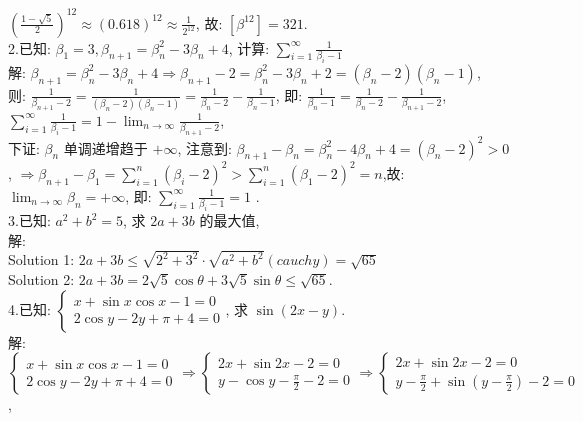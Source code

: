 \documentclass[a4paper,11pt,UTF8]{article}
\begin{document}
$\left(\frac{1-\sqrt{5}}{2}\right)^{12} \approx(0.618)^{12} \approx \frac{1}{2^{12}}$, 故: $\left[\beta^{12}\right]=321 . $\\
2.已知: $\beta_1=3, \beta_{n+1}=\beta_n^2-3 \beta_n+4$, 计算: $\displaystyle\sum_{i=1}^{\infty} \frac{1}{\beta_i-1}$\\
解: $\beta_{n+1}=\beta_n^2-3 \beta_n+4 \Rightarrow \beta_{n+1}-2=\beta_n^2-3 \beta_n+2=\left(\beta_n-2\right)\left(\beta_n-1\right)$,\\
则: $\displaystyle\frac{1}{\beta_{n+1}-2}=\frac{1}{\left(\beta_n-2\right)\left(\beta_n-1\right)}=\frac{1}{\beta_n-2}-\frac{1}{\beta_n-1}$, 即: $\displaystyle\frac{1}{\beta_n-1}=\frac{1}{\beta_n-2}-\frac{1}{\beta_{n+1}-2}$, $\displaystyle\sum_{i=1}^{\infty} \frac{1}{\beta_i-1}=1-\lim _{n \rightarrow \infty} \frac{1}{\beta_{n+1}-2}$,\\
下证: $\beta_n$ 单调递增趋于 $+\infty$, 注意到: $\beta_{n+1}-\beta_n=\beta_n^2-4 \beta_n+4=\left(\beta_n-2\right)^2>0$, $\displaystyle\Rightarrow\beta_{n+1}-\beta_1=\sum_{i=1}^n(\beta_i-2)^2>\sum_{i=1}^n(\beta_1-2)^2=n$,故: $\displaystyle\lim _{n \rightarrow \infty} \beta_n=+\infty$, 即: $\displaystyle\sum_{i=1}^{\infty} \frac{1}{\beta_i-1}=1$ .\\
3.已知: $a^2+b^2=5$, 求 $2 a+3 b$ 的最大值,\\
解:\\
Solution 1: $2 a+3 b \leq \sqrt{2^2+3^2} \cdot \sqrt{a^2+b^2}( cauchy )=\sqrt{65}$\\
Solution 2: $2 a+3 b = 2\sqrt{5}\cos\theta+3\sqrt{5}\sin\theta\leq\sqrt{65}$. \\
4.已知: $\left\{\begin{array}{l}x+\sin x \cos x-1=0 \\ 2 \cos y-2 y+\pi+4=0\end{array}\right.$, 求 $\sin (2 x-y)$.\\
解: $\left\{\begin{array}{l}x+\sin x \cos x-1=0 \\ 2 \cos y-2 y+\pi+4=0\end{array} \displaystyle\Rightarrow \left\{\begin{array}{l}2x+ \sin 2 x-2=0\\\displaystyle y-\cos y-\frac{\pi}{2}-2=0\end{array}\right.\right.\displaystyle\Rightarrow \left\{\begin{array}{l}2x+ \sin 2 x-2=0\\\displaystyle y-\frac{\pi}{2}+\sin (y-\frac{\pi}{2})-2=0\end{array}\right.$,\\
\end{document}
